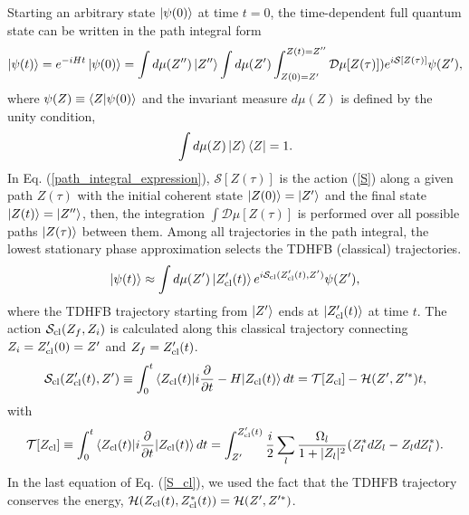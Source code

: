 \documentclass[%
superscriptaddress,
preprint,
showpacs,
nofootinbib,
amsmath,amssymb,
aps,
prc,
floatfix ]%
{revtex4-1}
\begin{document}
Starting an arbitrary state $\ket{\psi(0)}$ at time $t=0$,
the time-dependent full quantum state can be written in the path integral form
\begin{equation}
\ket{\psi(t)}
	= e^{-iHt} \ket{\psi(0)}
	= \int d\mu(Z'') \ket{Z''} \int d\mu(Z')
	\int_{Z(0)=Z'}^{Z(t)=Z''} \mathcal{D}\mu[Z(\tau)])
	e^{i\mathcal{S}[Z(\tau)]} \psi(Z') ,
\label{path_integral_expression}
\end{equation}
where $\psi(Z)\equiv \braket{Z|\psi(0)}$ and
the invariant measure $d\mu(Z)$ is defined by 
the unity condition,
\begin{equation}
  \int d\mu(Z) \ket{Z}\bra{Z} = 1 .
  \label{unity}
\end{equation}
In Eq. (\ref{path_integral_expression}),
$\mathcal{S}[Z(\tau)]$ is the action (\ref{S}) along a given path $Z(\tau)$
with the initial coherent state $\ket{Z(0)}=\ket{Z'}$ and
the final state $\ket{Z(t)}=\ket{Z''}$,
then, the integration $\int \mathcal {D}\mu[Z(\tau)]$
is performed over all possible paths $\ket{Z(\tau)}$ between them.
Among all trajectories in the path integral,
the lowest stationary phase approximation selects
the TDHFB (classical) trajectories.
\begin{equation}
	\ket{\psi(t)} \approx \int d\mu(Z') \ket{Z'_{\rm cl}(t)}
	e^{i\mathcal{S}_{\rm cl}(Z'_{\rm cl}(t),Z')} \psi(Z') ,
	\label{SPA}
\end{equation}
where the TDHFB trajectory starting from $\ket{Z'}$
ends at $\ket{Z'_{\rm cl}(t)}$ at time $t$.
The action $\mathcal{S}_{\rm cl}(Z_f,Z_i)$ is calculated along this
classical trajectory
connecting $Z_i=Z'_{\rm cl}(0)=Z'$ and $Z_f=Z'_{\rm cl}(t)$.
\begin{equation}
	\mathcal{S}_{\rm cl}(Z'_{\rm cl}(t),Z') \equiv \int_{0}^{t}
\braket{Z_{\rm cl}(t)|
	i\frac{\partial}{\partial t} - H
	|Z_{\rm cl}(t)} dt
	= \mathcal{T}[Z_{\rm cl}] - \mathcal{H}(Z',Z'^*) t 
	,
	\label{S_cl}
\end{equation}
with
\begin{equation}
\mathcal{T}[Z_{\rm cl}]\equiv
\int_{0}^{t} \braket{Z_{\rm cl}(t)| i\frac{\partial}{\partial t}
	|Z_{\rm cl}(t)} dt 
	= \int_{Z'}^{Z'_{\rm cl}(t)}
	\frac{i}{2} \sum_l \frac{\Omega_l}{1+|Z_l|^2}
  (Z_l^* dZ_l - Z_l dZ_l^*) .
\end{equation}
In the last equation of Eq. (\ref{S_cl}),
we used the fact that the TDHFB trajectory conserves the energy,
$\mathcal{H}(Z_{\rm cl}(t),Z_{\rm cl}^*(t))= \mathcal{H}(Z',Z'^*)$.
\end{document}
